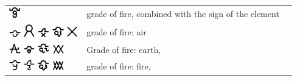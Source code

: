 \documentclass[british,final,landscape]{scrartcl}
\begin{document}
\begin{refsection}
\begin{supertabular}{p{0.3\textwidth}p{0.34\textwidth}p{0.34\textwidth}}
  \includegraphics[width=5mm]{Concepts/FireGrade} & grade of fire, combined with the sign of the element & \\
  \includegraphics[width=5mm]{Concepts/FireAerial} \includegraphics[width=5mm]{Concepts/FireAerial2} \includegraphics[width=5mm]{Concepts/FireAerial3} \includegraphics[width=5mm]{Concepts/FireAerial4} \includegraphics[width=5mm]{Concepts/FireAerial5} & grade of fire: air & \\
  \includegraphics[width=5mm]{Concepts/FireCineris}  \includegraphics[width=5mm]{Concepts/FireCineris2}  \includegraphics[width=5mm]{Concepts/FireCineris3}  \includegraphics[width=5mm]{Concepts/FireCineris4} & Grade of fire: earth,  &  \\
  \includegraphics[width=5mm]{Concepts/FireIgneAperto} \includegraphics[width=5mm]{Concepts/FireIgneAperto2} \includegraphics[width=5mm]{Concepts/FireIgneAperto3} \includegraphics[width=5mm]{Concepts/FireIgneAperto4}  & grade of fire: fire,  & \\

\end{supertabular}
\end{refsection}
\end{document}
